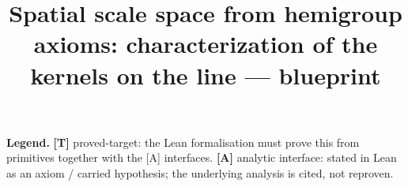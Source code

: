 \documentclass[11pt]{report}
\title{Spatial scale space from hemigroup axioms: characterization of the kernels on the line --- blueprint}
\author{}
\date{}
\begin{document}
\maketitle

\noindent\textbf{Legend.}\quad
\textbf{[T]} \textsf{proved-target}: the Lean formalisation must prove this from primitives together with
the [A] interfaces.\quad
\textbf{[A]} \textsf{analytic interface}: stated in Lean as an axiom / carried hypothesis; the underlying
analysis is cited, not reproven.

\tableofcontents


\end{document}
